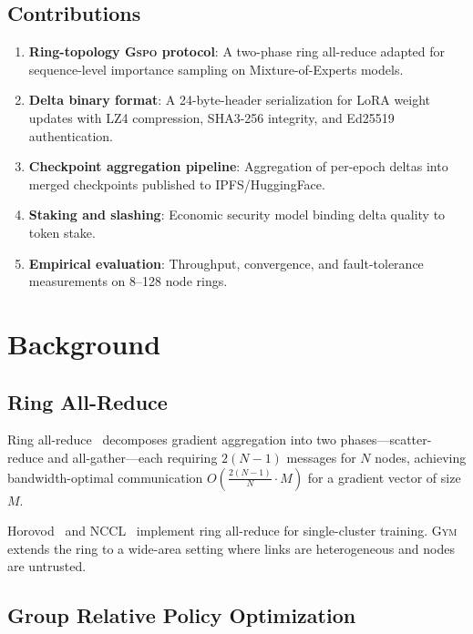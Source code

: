 \documentclass[11pt,letterpaper]{article}
\newcommand{\GYM}{\textsc{Gym}}
\newcommand{\GSPO}{\textsc{Gspo}}
\begin{document}
\subsection{Contributions}

\begin{enumerate}
    \item \textbf{Ring-topology \GSPO{} protocol}: A two-phase ring all-reduce adapted for sequence-level importance sampling on Mixture-of-Experts models.
    \item \textbf{Delta binary format}: A 24-byte-header serialization for LoRA weight updates with LZ4 compression, SHA3-256 integrity, and Ed25519 authentication.
    \item \textbf{Checkpoint aggregation pipeline}: Aggregation of per-epoch deltas into merged checkpoints published to IPFS/HuggingFace.
    \item \textbf{Staking and slashing}: Economic security model binding delta quality to token stake.
    \item \textbf{Empirical evaluation}: Throughput, convergence, and fault-tolerance measurements on 8--128 node rings.
\end{enumerate}

\section{Background}
\label{sec:background}

\subsection{Ring All-Reduce}

Ring all-reduce~\cite{patarasuk2009bandwidth} decomposes gradient aggregation into two phases---scatter-reduce and all-gather---each requiring $2(N-1)$ messages for $N$ nodes, achieving bandwidth-optimal communication $O\!\left(\frac{2(N-1)}{N} \cdot M\right)$ for a gradient vector of size $M$.

Horovod~\cite{sergeev2018horovod} and NCCL~\cite{nccl2024} implement ring all-reduce for single-cluster training.  \GYM{} extends the ring to a wide-area setting where links are heterogeneous and nodes are untrusted.

\subsection{Group Relative Policy Optimization}
\end{document}
